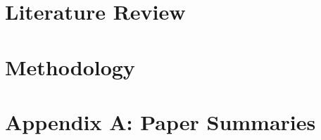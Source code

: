 \documentclass[]{article}
\begin{document}
\section{Literature Review}

\section{Methodology}



\newpage
\section{Appendix A: Paper Summaries}

\newpage

\newpage

\newpage

\newpage





\newpage


\end{document}
